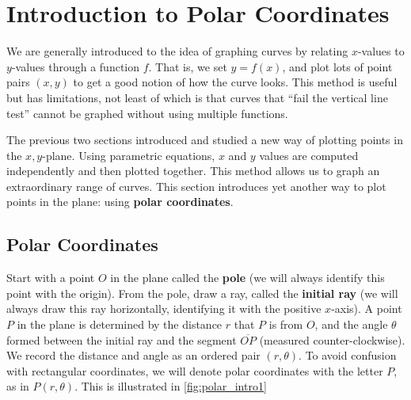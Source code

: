 \section{Introduction to Polar Coordinates}\label{sec:polar}

We are generally introduced to the idea of graphing curves by relating $x$-values to $y$-values through a function $f$. That is, we set $y=f(x)$, and plot lots of point pairs $(x,y)$ to get a good notion of how the curve looks. This method is useful but has limitations, not least of which is that curves that ``fail the vertical line test'' cannot be graphed without using multiple functions.

The previous two sections introduced and studied a new way of plotting points in the $x,y$-plane. Using parametric equations, $x$ and $y$ values are computed independently and then plotted together. This method allows us to graph an extraordinary range of curves. This section introduces yet another way to plot points in the plane: using \textbf{polar coordinates}.

\subsection*{Polar Coordinates}


Start with a point $O$ in the plane called the \textbf{pole} (we will always identify this point with the origin). From the pole, draw a ray, called the \textbf{initial ray} (we will always draw this ray horizontally, identifying it with the positive $x$-axis). A point $P$ in the plane is determined by the distance $r$ that $P$ is from $O$, and the angle $\theta$ formed between the initial ray and the segment $\overline{OP}$ (measured counter-clockwise). We record the distance and angle as an ordered pair $(r,\theta)$. To avoid confusion with rectangular coordinates, we will denote polar coordinates with the letter $P$, as in $P(r,\theta)$. This is illustrated in \autoref{fig:polar_intro1}

